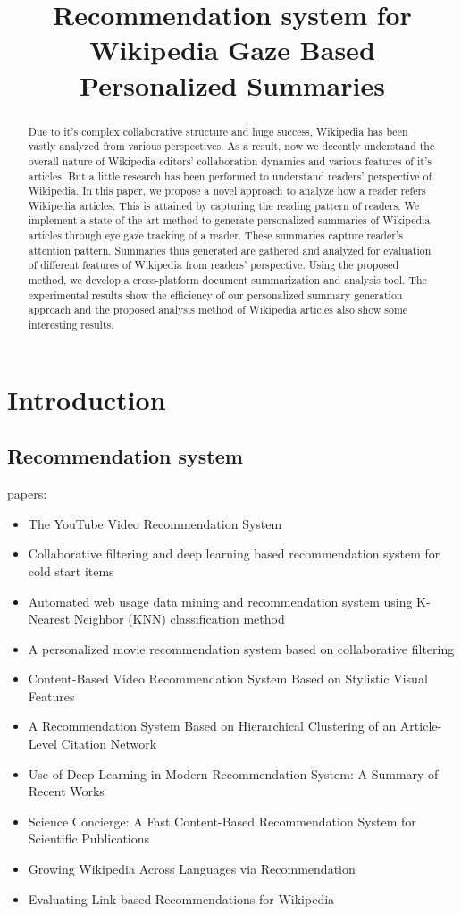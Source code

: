 \documentclass[12pt]{article}
\begin{document}
\title{Recommendation system for Wikipedia Gaze Based Personalized Summaries}
\maketitle

\begin{abstract}
  Due to it's complex collaborative structure and huge success, Wikipedia has been vastly analyzed from various perspectives. 
As a result, now we decently understand the overall nature of Wikipedia editors' collaboration dynamics and various features of it's articles. 
But a little research has been performed to understand readers' perspective of Wikipedia. 
In this paper, we propose a novel approach to analyze how a reader refers Wikipedia articles. 
This is attained by capturing the reading pattern of readers. 
We implement a state-of-the-art method to generate personalized summaries of Wikipedia articles through eye gaze tracking of a reader. 
These summaries capture reader's attention pattern. 
Summaries thus generated are gathered and analyzed for evaluation of different features of Wikipedia from readers' perspective. 
Using the proposed method, we develop a cross-platform document summarization and analysis tool. 
The experimental results show the efficiency of our personalized summary generation approach and the proposed analysis method of Wikipedia articles also show some interesting results.
\end{abstract}

\section{Introduction}

\subsection{Recommendation system}
papers: 
\begin{itemize}
\item The YouTube Video Recommendation System
\item Collaborative filtering and deep learning based recommendation system for cold start items
\item Automated web usage data mining and recommendation system using K-Nearest Neighbor (KNN) classification method
\item A personalized movie recommendation system based on collaborative filtering
\item Content-Based Video Recommendation System Based on Stylistic Visual Features
\item A Recommendation System Based on Hierarchical Clustering of an Article-Level Citation Network
\item Use of Deep Learning in Modern Recommendation System: A Summary of Recent Works
\item Science Concierge: A Fast Content-Based Recommendation System for Scientific Publications
\item Growing Wikipedia Across Languages via Recommendation
\item Evaluating Link-based Recommendations for Wikipedia
\end{itemize}
\end{document}
